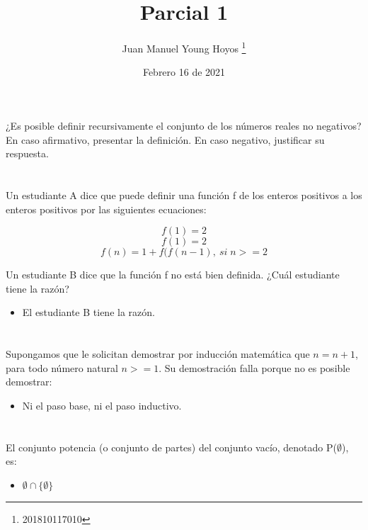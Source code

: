 \documentclass[12pt, letterpaper, twoside]{article}
\title{Parcial 1}
\date{Febrero 16 de 2021}
\author{Juan Manuel Young Hoyos \thanks{201810117010}}
\begin{document}
    \maketitle

    \section{}

    ¿Es posible definir recursivamente el conjunto de los números reales no negativos? En
    caso afirmativo, presentar la definición. En caso negativo, justificar su respuesta.

    \section{}

    Un estudiante A dice que puede definir una función f de los enteros positivos a los 
    enteros positivos por las siguientes ecuaciones:

    \[ f(1)=2 \]
    \[ f(1) = 2 \]
    \[ f(n) = 1 + f(f(n-1),\:si \; n>=2 \]

    Un estudiante B dice que la función f no está bien definida. ¿Cuál estudiante tiene la razón?

    \begin{itemize}
        \item El estudiante B tiene la razón.
    \end{itemize}

    \section{}

    Supongamos que le solicitan demostrar por inducción matemática que $n = n + 1$, 
    para todo número natural $n >= 1$. Su demostración falla porque no es posible demostrar:

    \begin{itemize}
        \item Ni el paso base, ni el paso inductivo.
    \end{itemize}
 
    \section{}

    El conjunto potencia (o conjunto de partes) del conjunto vacío, denotado P($\emptyset$), es:

     \begin{itemize}
         \item  $\emptyset \cap \{\emptyset\} $
     \end{itemize}
\end{document}
